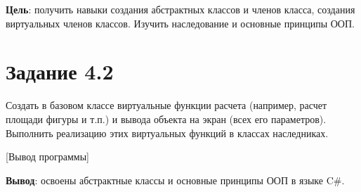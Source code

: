 \documentclass{bsuir}
\newcommand{\csharp}{C{\liberationrm\#}}
\begin{document}

    \textbf{Цель}: получить навыки создания абстрактных классов и членов класса,
    создания виртуальных членов классов. Изучить наследование и основные принципы
    ООП.

    \section*{Задание 4.2}

    Создать в базовом классе виртуальные функции расчета (например, расчет площади
    фигуры и т.п.) и вывода объекта на экран (всех его параметров). Выполнить
    реализацию этих виртуальных функций в классах наследниках.


    [Вывод программы]

    \textbf{Вывод}: освоены абстрактные классы и основные принципы ООП в языке
    \csharp.
\end{document}
